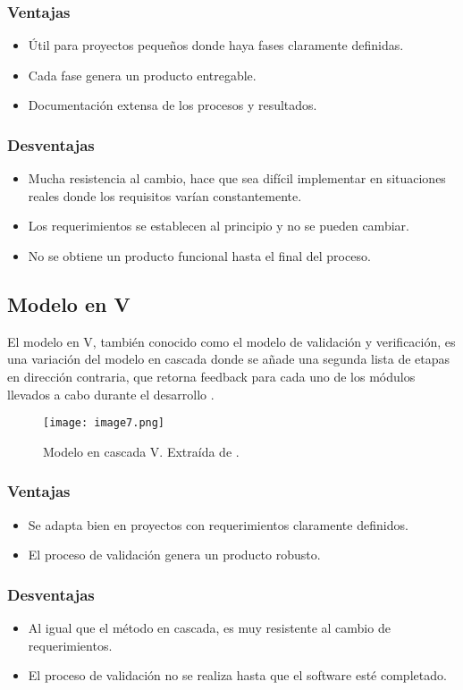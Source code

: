 \subsubsection{Ventajas}
\begin{itemize}
  \item Útil para proyectos pequeños donde haya fases claramente definidas.
  \item Cada fase genera un producto entregable.
  \item Documentación extensa de los procesos y resultados.
\end{itemize}
\subsubsection{Desventajas}
\begin{itemize}
  \item Mucha resistencia al cambio, hace que sea difícil implementar en situaciones reales donde los requisitos varían constantemente.
  \item Los requerimientos se establecen al principio y no se pueden cambiar.
  \item No se obtiene un producto funcional hasta el final del proceso.
\end{itemize}
%
%
\subsection{Modelo en V}
\par El modelo en V, también conocido como el modelo de validación y verificación, es una variación del modelo en cascada \cite{rupareliaSoftwareDevelopmentLifecycle2010} donde se añade una segunda lista de etapas en dirección contraria, que retorna feedback para cada uno de los módulos llevados a cabo durante el desarrollo \cite{pressmanIngenieriaSoftwareEnfoque2013,rupareliaSoftwareDevelopmentLifecycle2010,dwivediComparativeStudyVarious2022}.
%
\begin{figure}[h]
  \centering
  \texttt{[image: image7.png]}
  \caption{Modelo en cascada V. Extraída de \cite{pressmanIngenieriaSoftwareEnfoque2013}.}
  \label{fig:x modelo en v}
\end{figure}
%
\subsubsection{Ventajas}
\begin{itemize}
    \item Se adapta bien en proyectos con requerimientos claramente definidos.
    \item El proceso de validación genera un producto robusto.
\end{itemize}
\subsubsection{Desventajas}
\begin{itemize}
    \item Al igual que el método en cascada, es muy resistente al cambio de requerimientos.
    \item El proceso de validación no se realiza hasta que el software esté completado.
\end{itemize}